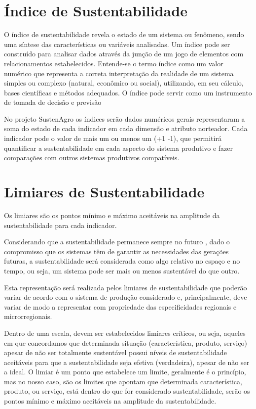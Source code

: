 
\section{Índice de Sustentabilidade}

O índice de sustentabilidade revela o estado de um sistema ou fenômeno,
sendo uma síntese das características ou variáveis analisadas. Um
índice pode ser construído para analisar dados através da junção de
um jogo de elementos com relacionamentos estabelecidos. Entende-se
o termo índice como um valor numérico que representa a correta interpretação
da realidade de um sistema simples ou complexo (natural, econômico
ou social), utilizando, em seu cálculo, bases científicas e métodos
adequados. O índice pode servir como um instrumento de tomada de decisão
e previsão \citep{SicheAgostinho2007}

No projeto SustenAgro os índices serão dados numéricos gerais representaram
a soma do estado de cada indicador em cada dimensão e atributo norteador.
Cada indicador pode o valor de mais um ou menos um (+1 -1), que permitirá
quantificar a sustentabilidade em cada aspecto do sistema produtivo
e fazer comparações com outros sistemas produtivos compatíveis.

\section{Limiares de Sustentabilidade}

Os limiares são os pontos mínimo e máximo aceitáveis na amplitude
da sustentabilidade para cada indicador.

Considerando que a sustentabilidade permanece sempre no futuro \citep{gliessman2001agroecologia},
dado o compromisso que os sistemas têm de garantir as necessidades
das gerações futuras, a sustentabilidade será considerada como algo
relativo no espaço e no tempo, ou seja, um sistema pode ser mais ou
menos sustentável do que outro.

Esta representação será realizada pelos limiares de sustentabilidade
que poderão variar de acordo com o sistema de produção considerado
e, principalmente, deve variar de modo a representar com propriedade
das especificidades regionais e microrregionais.

Dentro de uma escala, devem ser estabelecidos limiares críticos, ou
seja, aqueles em que concordamos que determinada situação (característica,
produto, serviço) apesar de não ser totalmente sustentável possui
níveis de sustentabilidade aceitáveis para que a sustentabilidade
seja efetiva (verdadeira), apesar de não ser a ideal. O limiar é um
ponto que estabelece um limite, geralmente é o princípio, mas no nosso
caso, são os limites que apontam que determinada característica, produto,
ou serviço, está dentro do que for considerado sustentabilidade, serão
os pontos mínimo e máximo aceitáveis na amplitude da sustentabilidade.

